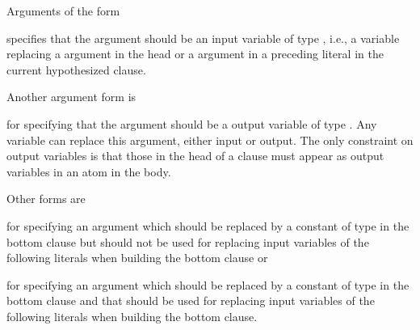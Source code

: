 \documentclass[letterpaper,10pt,english]{sphinxmanual}
\begin{document}
Arguments of the form

%
\begin{sphinxVerbatim}[commandchars=\\\{\}]
\end{sphinxVerbatim}

specifies that the argument should be an input variable of type , i.e., a variable replacing a  argument in the head or a  argument in a preceding literal in the current hypothesized clause.

Another argument form is

%
\begin{sphinxVerbatim}[commandchars=\\\{\}]
\end{sphinxVerbatim}

for specifying that the argument should be a output variable of type .
Any variable can replace this argument, either input or output.
The only constraint on output variables is that those in the head of a clause must appear as output variables in an atom in the body.

Other forms are

%
\begin{sphinxVerbatim}[commandchars=\\\{\}]
\end{sphinxVerbatim}

for specifying an argument which should be replaced by a constant of type  in the bottom clause but should not be used for replacing input variables of the following literals when building the bottom clause or

%
\begin{sphinxVerbatim}[commandchars=\\\{\}]
\end{sphinxVerbatim}

for specifying an argument which should be replaced by a constant of type  in the bottom clause and that should be used for replacing input variables of the following literals when building the bottom clause.
\end{document}
